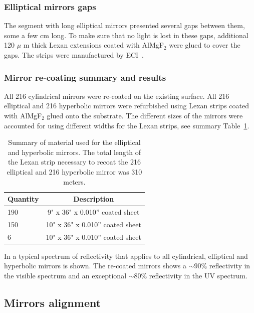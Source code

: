 \subsubsection{Elliptical mirrors gaps}

The segment with long elliptical mirrors presented several gaps between them, some a few cm long. To make sure that no light is lost in these gaps,
additional 120 $\mu$ m thick Lexan extensions coated with AlMgF$_2$ were glued to cover the gaps. The strips were manufactured by ECI~\cite{ECI}.


\subsubsection{Mirror re-coating summary and results}

All 216 cylindrical mirrors were re-coated on the existing surface. All 216 elliptical and 216 hyperbolic mirrors were refurbished using Lexan strips
coated with AlMgF$_2$ glued onto the substrate. The different sizes of the mirrors were accounted for using different widths for the Lexan strips, see
summary Table~\ref{tab:strips}.


\begin{table}[h]
	\begin{center}
		\begin{tabular}{| l | c |}
			\hline \hline
			Quantity  & Description \\
			\hline
			190       & 9" x 36" x 0.010” coated sheet    \\
			150       & 10" x 36" x 0.010” coated sheet   \\
			6         & 10" x 36" x 0.010” coated sheet   \\
			\hline \hline
		\end{tabular}
	\end{center}
	\caption{Summary of material used for the elliptical and hyperbolic mirrors. The total length of the Lexan strip necessary to recoat the 216 elliptical
            and 216 hyperbolic mirror was 310 meters.}\label{tab:strips}
\end{table}


In  a typical spectrum of reflectivity that applies to all cylindrical, elliptical and hyperbolic mirrors is shown.
The re-coated mirrors shows a $\sim 90\%$ reflectivity in the visible spectrum and an exceptional $\sim 80\%$
reflectivity in the UV spectrum.



\subsection{Mirrors alignment}

